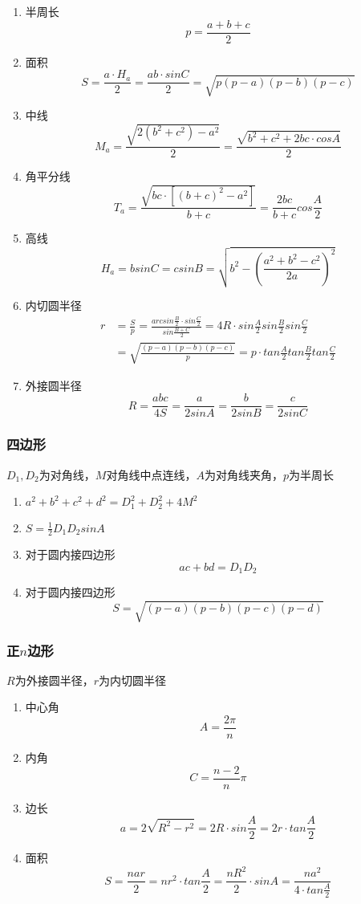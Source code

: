 \documentclass[a4paper]{ctexart}
\begin{document}
\begin{enumerate}
	\item 半周长
	$$p=\frac{a+b+c}{2}$$
	\item 面积
	$$S=\frac{a \cdot H_a}{2}=\frac{ab \cdot sinC}{2}=\sqrt{p(p-a)(p-b)(p-c)}$$
	\item 中线
	$$M_a=\frac{\sqrt{2(b^2+c^2)-a^2}}{2}=\frac{\sqrt{b^2+c^2+2bc \cdot cosA}}{2}$$
	\item 角平分线 
	$$T_a=\frac{\sqrt{bc \cdot [(b+c)^2-a^2]}}{b+c}=\frac{2bc}{b+c}cos\frac{A}{2}$$
	\item 高线
	$$H_a=bsinC=csinB=\sqrt{b^2-(\frac{a^2+b^2-c^2}{2a})^2}$$
	\item 内切圆半径
	\begin{align*}
	r&=\frac{S}{p}=\frac{arcsin\frac{B}{2} \cdot sin\frac{C}{2}}{sin\frac{B+C}{2}}=4R \cdot sin\frac{A}{2}sin\frac{B}{2}sin\frac{C}{2}\\
	&=\sqrt{\frac{(p-a)(p-b)(p-c)}{p}}=p \cdot tan\frac{A}{2}tan\frac{B}{2}tan\frac{C}{2}
	\end{align*}
	\item 外接圆半径
	$$R=\frac{abc}{4S}=\frac{a}{2sinA}=\frac{b}{2sinB}=\frac{c}{2sinC}$$
\end{enumerate}

\subsubsection{四边形}

$D_1, D_2$为对角线，$M$对角线中点连线，$A$为对角线夹角，$p$为半周长
\begin{enumerate}
	\item $a^2+b^2+c^2+d^2=D_1^2+D_2^2+4M^2$
	\item $S=\frac{1}{2}D_1D_2sinA$
	\item 对于圆内接四边形
	$$ac+bd=D_1D_2$$
	\item 对于圆内接四边形
	$$S=\sqrt{(p-a)(p-b)(p-c)(p-d)}$$
\end{enumerate}

\subsubsection{正$n$边形}

$R$为外接圆半径，$r$为内切圆半径
\begin{enumerate}
	\item 中心角
	$$A=\frac{2\pi}{n}$$
	\item 内角
	$$C=\frac{n-2}{n}\pi$$
	\item 边长
	$$a=2\sqrt{R^2-r^2}=2R \cdot sin\frac{A}{2}=2r \cdot tan\frac{A}{2}$$
	\item 面积
	$$S=\frac{nar}{2}=nr^2 \cdot tan\frac{A}{2}=\frac{nR^2}{2} \cdot sinA=\frac{na^2}{4 \cdot tan\frac{A}{2}}$$
\end{enumerate}
\end{document}

